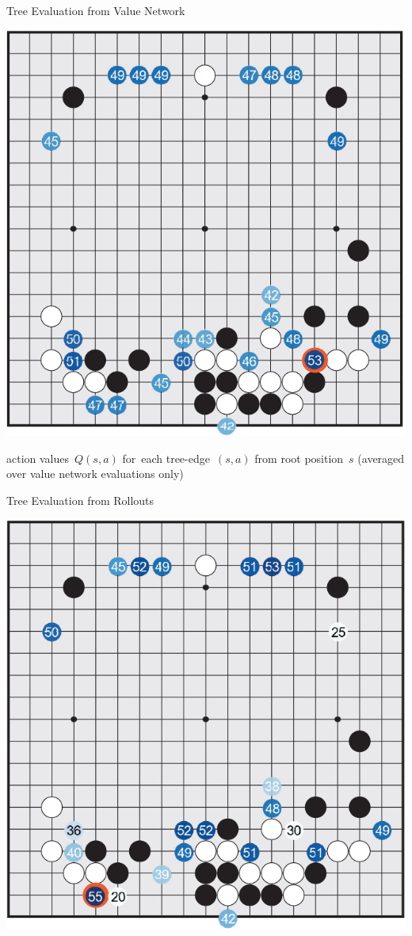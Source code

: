 \documentclass{beamer}
\begin{document}
{    \begin{frame}{Tree Evaluation from Value Network}
      \begin{center}
        \includegraphics[height=.82\textheight]{../img/tree_eval_from_value_network.png}

        \tiny
        action values~$Q(s, a)$ for~each tree-edge~$(s, a)$ from root position~$s$ (averaged over value network evaluations only)
      \end{center}
    \end{frame}

    \begin{frame}{Tree Evaluation from Rollouts}
      \begin{center}
        \includegraphics[height=.82\textheight]{../img/tree_eval_from_rollouts.png}


\end{center}
\end{frame}}
\end{document}
